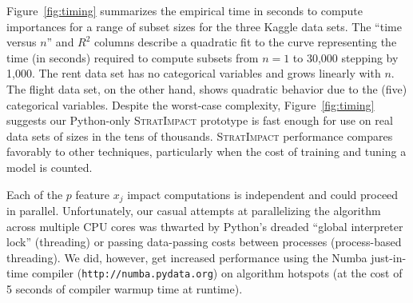 \documentclass[11pt]{article}
\newcommand{\figref}[1]{Figure~\ref{#1}}
\newcommand{\simp}{\fontfamily{cmr}\textsc{\small StratImpact}}
\begin{document}
\figref{fig:timing} summarizes the empirical time in seconds to compute importances for a range of subset sizes for the three Kaggle data sets. The ``time versus $n$'' and $R^2$ columns describe a quadratic fit to the curve representing the time (in seconds) required to compute subsets from $n=1$ to 30,000 stepping by 1,000. The rent data set has no categorical variables and grows linearly with $n$. The flight data set, on the other hand, shows quadratic behavior due to the (five) categorical variables. Despite the worst-case complexity, \figref{fig:timing} suggests our Python-only \simp{} prototype is fast enough for use on real data sets of sizes in the tens of thousands. \simp{} performance compares favorably to other techniques, particularly when the cost of training and tuning a model is counted.

Each of the $p$ feature $x_j$ impact computations is independent and could proceed in parallel. Unfortunately, our casual attempts at parallelizing the algorithm across multiple CPU cores was thwarted by Python's dreaded ``global interpreter lock'' (threading) or passing data-passing costs between processes (process-based threading).  We did, however, get increased performance using the Numba just-in-time compiler ({\tt\small http://numba.pydata.org}) on algorithm hotspots (at the cost of 5 seconds of compiler warmup time at runtime).
\end{document}
